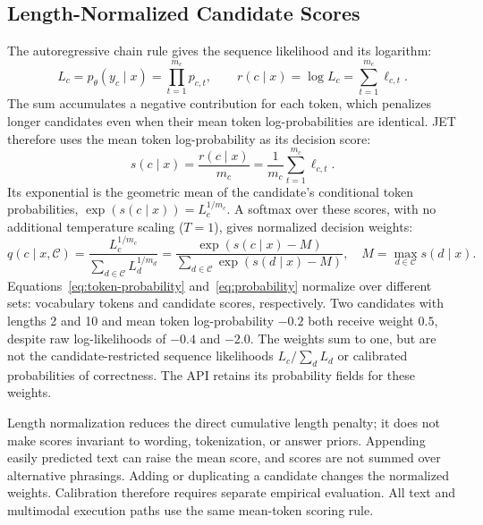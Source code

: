 \subsection{Length-Normalized Candidate Scores}
The autoregressive chain rule gives the sequence likelihood and its logarithm:
\begin{equation}
  L_c=p_\theta(y_c\mid x)=\prod_{t=1}^{m_c}p_{c,t},
  \qquad
  r(c\mid x)=\log L_c=\sum_{t=1}^{m_c}\ell_{c,t}.
  \label{eq:sequence-likelihood}
\end{equation}
The sum accumulates a negative contribution for each token, which penalizes
longer candidates even when their mean token log-probabilities are identical.
JET therefore uses the mean token log-probability as its decision score:
\begin{equation}
  s(c\mid x)=\frac{r(c\mid x)}{m_c}
  =\frac{1}{m_c}\sum_{t=1}^{m_c}\ell_{c,t}.
  \label{eq:score}
\end{equation}
Its exponential is the geometric mean of the candidate's conditional token
probabilities, $\exp(s(c\mid x))=L_c^{1/m_c}$. A softmax over these scores,
with no additional temperature scaling ($T=1$), gives normalized decision
weights:
\begin{equation}
  q(c\mid x,\mathcal{C})
  =\frac{L_c^{1/m_c}}{\sum_{d\in\mathcal{C}}L_d^{1/m_d}}
  =\frac{\exp(s(c\mid x)-M)}
        {\sum_{d\in\mathcal{C}}\exp(s(d\mid x)-M)},
  \quad M=\max_{d\in\mathcal{C}}s(d\mid x).
  \label{eq:probability}
\end{equation}
Equations~\ref{eq:token-probability} and~\ref{eq:probability} normalize over
different sets: vocabulary tokens and candidate scores, respectively. Two
candidates with lengths 2 and 10 and mean token log-probability $-0.2$ both
receive weight $0.5$, despite raw log-likelihoods of $-0.4$ and $-2.0$.
The weights sum to one, but are not the candidate-restricted sequence
likelihoods $L_c/\sum_d L_d$ or calibrated probabilities of correctness.
The API retains its probability fields for these weights.

Length normalization reduces the direct cumulative length penalty; it does not
make scores invariant to wording, tokenization, or answer priors. Appending
easily predicted text can raise the mean score, and scores are not summed over
alternative phrasings. Adding or duplicating a candidate changes the normalized
weights. Calibration therefore requires separate empirical evaluation.
All text and multimodal execution paths use the same mean-token scoring rule.

